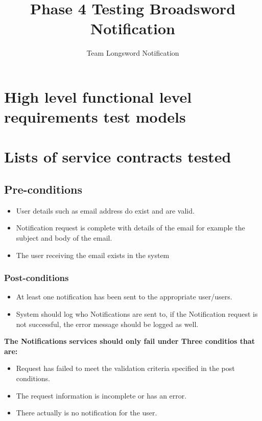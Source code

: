 \documentclass[11pt]{article}
\author{Team Longsword Notification}
\title{Phase 4 Testing Broadsword Notification}
\begin{document}
	\setlength{\parskip}{6pt}
	
	
	
	\tableofcontents
	
	\newpage
	
	\section{High level functional level requirements test models}
	\section{Lists of service contracts tested}
	\subsection{Pre-conditions}
	\begin{itemize}
		\item User details such as email address do exist and are valid.
		\item Notification request is complete with details of the email for example the subject and body of the email.
		\item The user receiving the email exists in the system
	\end{itemize}
	\subsubsection{Post-conditions}
	\begin{itemize}
		\item At least one notification has been sent to the appropriate user/users.
		\item System should log who Notifications are sent to, if the Notification request is not successful, the error message should be logged as well.
	\end{itemize}
	\textbf{The Notifications services should only fail under Three conditios that are:}
	\begin{itemize}
		\item Request has failed to meet the validation criteria specified in the post conditions.
		\item The request information is incomplete or has an error.
		\item There actually is no notification for the user.
	\end{itemize}
\end{document}

